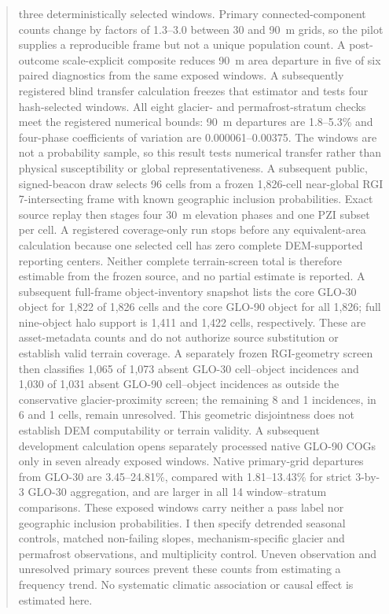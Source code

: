 \documentclass[11pt]{article}
\begin{document}
\begin{abstract}
three deterministically selected windows. Primary connected-component counts
change by factors of 1.3--3.0 between 30 and 90~m grids, so the pilot supplies
a reproducible frame but not a unique population count. A post-outcome
scale-explicit composite reduces 90~m area departure in five of six paired
diagnostics from the same exposed windows. A subsequently registered blind
transfer calculation freezes that estimator and tests four hash-selected
windows. All eight glacier- and permafrost-stratum checks meet the registered
numerical bounds: 90~m departures are 1.8--5.3\% and four-phase coefficients
of variation are 0.000061--0.00375. The windows are not a probability sample,
so this result tests numerical transfer rather than physical susceptibility or
global representativeness. A subsequent public, signed-beacon draw selects 96
cells from a frozen 1,826-cell near-global RGI 7-intersecting frame with known
geographic inclusion probabilities. Exact source replay then stages four
30~m elevation phases and one PZI subset per cell. A registered coverage-only
run stops before any equivalent-area calculation because one selected cell has
zero complete DEM-supported reporting centers. Neither complete terrain-screen
total is therefore estimable from the frozen source, and no partial estimate is
reported. A subsequent full-frame object-inventory snapshot lists the core
GLO-30 object for 1,822 of 1,826 cells and the core GLO-90 object for all 1,826;
full nine-object halo support is 1,411 and 1,422 cells, respectively. These are
asset-metadata counts and do not authorize source substitution or establish
valid terrain coverage. A separately frozen RGI-geometry screen then classifies
1,065 of 1,073 absent GLO-30 cell--object incidences and 1,030 of 1,031 absent
GLO-90 cell--object incidences as outside the conservative glacier-proximity
screen; the remaining 8 and 1 incidences, in 6 and 1 cells, remain unresolved.
This geometric disjointness does not establish DEM computability or terrain
validity. A subsequent development calculation opens separately processed
native GLO-90 COGs only in seven already exposed windows. Native primary-grid
departures from GLO-30 are 3.45--24.81\%, compared with 1.81--13.43\% for
strict 3-by-3 GLO-30 aggregation, and are larger in all 14 window--stratum
comparisons. These exposed windows carry neither a pass label nor geographic
inclusion probabilities. I then specify detrended seasonal controls,
matched non-failing slopes, mechanism-specific glacier and permafrost
observations, and multiplicity control. Uneven observation and unresolved
primary sources prevent these counts from estimating a frequency trend. No
systematic climatic association or causal effect is estimated here.
\end{abstract}
\end{document}
